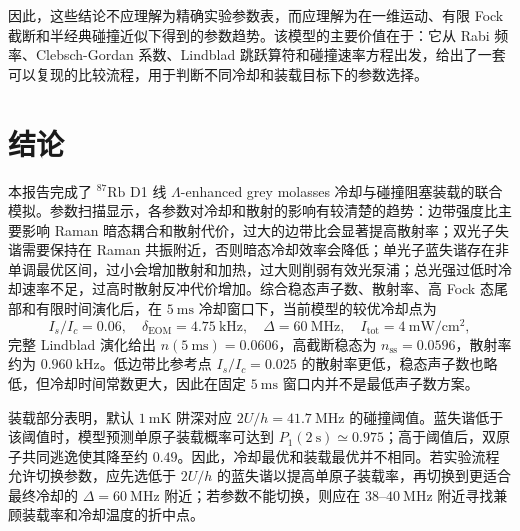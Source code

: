\documentclass[UTF8,a4paper,12pt]{ctexart}
\newcommand{\Rb}{\ensuremath{^{87}\mathrm{Rb}}}
\begin{document}
因此，这些结论不应理解为精确实验参数表，而应理解为在一维运动、有限 Fock 截断和半经典碰撞近似下得到的参数趋势。该模型的主要价值在于：它从 Rabi 频率、Clebsch-Gordan 系数、Lindblad 跳跃算符和碰撞速率方程出发，给出了一套可以复现的比较流程，用于判断不同冷却和装载目标下的参数选择。

\section{结论}

本报告完成了 \Rb{} D1 线 $\Lambda$-enhanced grey molasses 冷却与碰撞阻塞装载的联合模拟。参数扫描显示，各参数对冷却和散射的影响有较清楚的趋势：边带强度比主要影响 Raman 暗态耦合和散射代价，过大的边带比会显著提高散射率；双光子失谐需要保持在 Raman 共振附近，否则暗态冷却效率会降低；单光子蓝失谐存在非单调最优区间，过小会增加散射和加热，过大则削弱有效光泵浦；总光强过低时冷却速率不足，过高时散射反冲代价增加。综合稳态声子数、散射率、高 Fock 态尾部和有限时间演化后，在 $5~\mathrm{ms}$ 冷却窗口下，当前模型的较优冷却点为
\[
I_s/I_c=0.06,\quad
\delta_{\mathrm{EOM}}=4.75~\mathrm{kHz},\quad
\Delta=60~\mathrm{MHz},\quad
I_{\mathrm{tot}}=4~\mathrm{mW/cm^2},
\]
完整 Lindblad 演化给出 $n(5~\mathrm{ms})=0.0606$，高截断稳态为 $n_{\mathrm{ss}}=0.0596$，散射率约为 $0.960~\mathrm{kHz}$。低边带比参考点 $I_s/I_c=0.025$ 的散射率更低，稳态声子数也略低，但冷却时间常数更大，因此在固定 $5~\mathrm{ms}$ 窗口内并不是最低声子数方案。

装载部分表明，默认 $1~\mathrm{mK}$ 阱深对应 $2U/h=41.7~\mathrm{MHz}$ 的碰撞阈值。蓝失谐低于该阈值时，模型预测单原子装载概率可达到 $P_1(2~\mathrm{s})\simeq0.975$；高于阈值后，双原子共同逃逸使其降至约 $0.49$。因此，冷却最优和装载最优并不相同。若实验流程允许切换参数，应先选低于 $2U/h$ 的蓝失谐以提高单原子装载率，再切换到更适合最终冷却的 $\Delta=60~\mathrm{MHz}$ 附近；若参数不能切换，则应在 $38$--$40~\mathrm{MHz}$ 附近寻找兼顾装载率和冷却温度的折中点。
\end{document}
